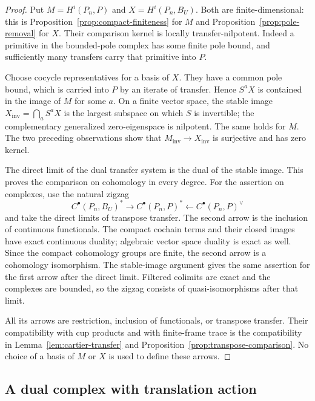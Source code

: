 \begin{proof}
Put $M=H^i(P_n,P)$ and $X=H^i(P_n,B_U)$.  Both are finite-dimensional:
this is Proposition~\ref{prop:compact-finiteness} for $M$ and
Proposition~\ref{prop:pole-removal} for $X$.  Their comparison kernel is
locally transfer-nilpotent.  Indeed a primitive in the bounded-pole
complex has some finite pole bound, and sufficiently many transfers
carry that primitive into $P$.

Choose cocycle representatives for a basis of $X$.  They have a common
pole bound, which is carried into $P$ by an iterate of transfer.  Hence
$S^aX$ is contained in the image of $M$ for some $a$.  On a finite vector
space, the stable image $X_{\mathrm{inv}}=\bigcap_a S^aX$ is the largest
subspace on which $S$ is invertible; the complementary generalized
zero-eigenspace is nilpotent.  The same holds for $M$.  The two preceding
observations show that $M_{\mathrm{inv}}\to X_{\mathrm{inv}}$ is
surjective and has zero kernel.

The direct limit of the dual transfer system is the dual of the stable
image.  This proves the comparison on cohomology in every degree.  For
the assertion on complexes, use the natural zigzag
\[
 C^\bullet(P_n,B_U)^*
   \longrightarrow C^\bullet(P_n,P)^*
   \longleftarrow C^\bullet(P_n,P)^\vee
\]
and take the direct limits of transpose transfer.  The second arrow is
the inclusion of continuous functionals.  The compact cochain terms and
their closed images have exact continuous duality; algebraic vector
space duality is exact as well.  Since the compact cohomology groups are
finite, the second arrow is a cohomology isomorphism.  The stable-image
argument gives the same assertion for the first arrow after the direct
limit.  Filtered colimits are exact and the complexes are bounded, so
the zigzag consists of quasi-isomorphisms after that limit.

All its arrows are restriction, inclusion of functionals, or transpose
transfer.  Their compatibility with cup products and with finite-frame
trace is the compatibility in
Lemma~\ref{lem:cartier-transfer} and
Proposition~\ref{prop:transpose-comparison}.  No choice of a basis of
$M$ or $X$ is used to define these arrows.
\end{proof}

\subsection{A dual complex with translation action}

